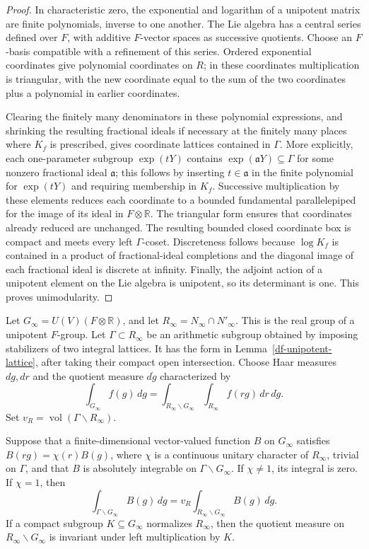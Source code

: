 \begin{proof}
In characteristic zero, the exponential and logarithm of a
unipotent matrix are finite polynomials, inverse to one another.
The Lie algebra has a central series defined over $F$, with
additive $F$-vector spaces as successive quotients.  Choose an
$F$-basis compatible with a refinement of this series.  Ordered
exponential coordinates give polynomial coordinates on $R$; in
these coordinates multiplication is triangular, with the new
coordinate equal to the sum of the two coordinates plus a
polynomial in earlier coordinates.

Clearing the finitely many denominators in these polynomial
expressions, and shrinking the resulting fractional ideals if
necessary at the finitely many places where $K_f$ is prescribed,
gives coordinate lattices contained in $\Gamma$.  More explicitly,
each one-parameter subgroup $\exp(tY)$ contains
$\exp(\mathfrak a Y)\subseteq\Gamma$ for some nonzero fractional
ideal $\mathfrak a$; this follows by inserting $t\in\mathfrak a$
in the finite polynomial for $\exp(tY)$ and requiring membership
in $K_f$.  Successive multiplication by these elements reduces
each coordinate to a bounded fundamental parallelepiped for the
image of its ideal in $F\otimes\mathbb R$.  The triangular form
ensures that coordinates already reduced are unchanged.  The
resulting bounded closed coordinate box is compact and meets every
left $\Gamma$-coset.  Discreteness follows because $\log K_f$ is
contained in a product of fractional-ideal completions and the
diagonal image of each fractional ideal is discrete at infinity.
Finally, the adjoint action of a unipotent element on the Lie
algebra is unipotent, so its determinant is one.  This proves
unimodularity.
\end{proof}

Let $G_\infty=U(V)(F\otimes\mathbb R)$, and let
$R_\infty=N_\infty\cap N'_\infty$.  This is the real group of a
unipotent $F$-group.  Let $\Gamma\subset R_\infty$ be an arithmetic
subgroup obtained by imposing stabilizers of two integral lattices.
It has the form in Lemma~\ref{df-unipotent-lattice}, after taking
their compact open intersection.  Choose Haar measures $dg,dr$ and
the quotient measure $d\dot g$ characterized by
\[
 \int_{G_\infty}f(g)\,dg
 =\int_{R_\infty\backslash G_\infty}
       \int_{R_\infty}f(rg)\,dr\,d\dot g.
\]
Set $v_R=\operatorname{vol}(\Gamma\backslash R_\infty)$.

\begin{lemma}\label{df-average}
Suppose that a finite-dimensional vector-valued function $B$ on
$G_\infty$ satisfies $B(rg)=\chi(r)B(g)$, where $\chi$ is a
continuous unitary character of $R_\infty$, trivial on $\Gamma$,
and that $B$ is absolutely integrable on
$\Gamma\backslash G_\infty$.
If $\chi\ne1$, its integral is zero.  If $\chi=1$, then
\begin{equation}\label{df-disintegration}
 \int_{\Gamma\backslash G_\infty}B(g)\,dg
 =v_R\int_{R_\infty\backslash G_\infty}B(g)\,d\dot g.
\end{equation}
If a compact subgroup $K\subseteq G_\infty$ normalizes $R_\infty$,
then the quotient measure on $R_\infty\backslash G_\infty$ is
invariant under left multiplication by $K$.
\end{lemma}

